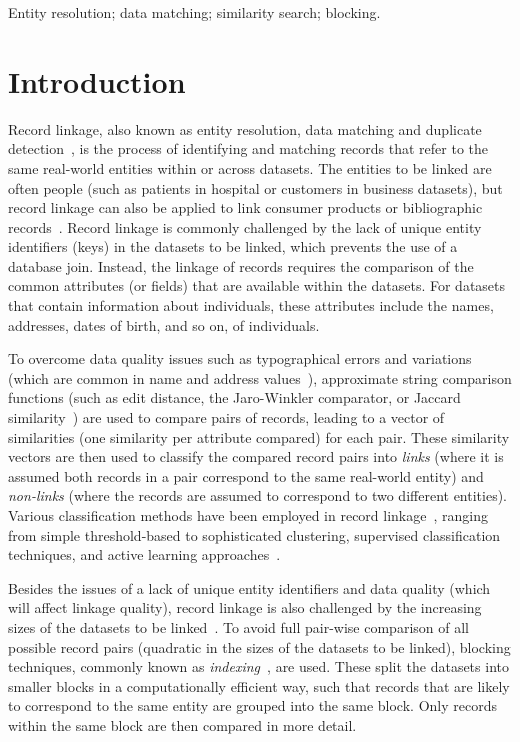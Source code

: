 \documentclass{llncs}
\begin{document}
\keywords Entity resolution; data matching; similarity search;
         blocking.


\section{Introduction}
\label{sec-intro}

Record linkage, also known as entity resolution, data matching and
duplicate detection~\cite{Chr12}, is the process of identifying and
matching records that refer to the same real-world entities within or
across datasets. The entities to be linked are often people (such as
patients in hospital or customers in business datasets), but record
linkage can also be applied to link consumer products or bibliographic
records~\cite{Chr12}. Record linkage is commonly challenged by the lack
of unique entity identifiers (keys) in the datasets to be linked, which
prevents the use of a database join. Instead, the linkage of records
requires the comparison of the common attributes (or fields) that are
available within the datasets. For datasets that contain information
about individuals, these attributes include the names, addresses,
dates of birth, and so on, of individuals.

To overcome data quality issues such as typographical errors and
variations (which are common in name and address values~\cite{Chr12}),
approximate string comparison functions (such as edit distance, the
Jaro-Winkler comparator, or Jaccard similarity~\cite{Chr12}) are used to
compare pairs of records, leading to a vector of similarities (one
similarity per attribute compared) for each pair. These similarity
vectors are then used to classify the compared record pairs into
\emph{links} (where it is assumed both records in a pair correspond to
the same real-world entity) and \emph{non-links} (where the records are
assumed to correspond to two different entities). Various
classification methods have been employed in record
linkage~\cite{Chr12,Don15}, ranging from simple threshold-based to
sophisticated clustering, supervised classification techniques, and
active learning approaches~\cite{Wan15}.

Besides the issues of a lack of unique entity identifiers and data
quality (which will affect linkage quality), record linkage is also
challenged by the increasing sizes of the datasets to be
linked~\cite{Don15}. To avoid full pair-wise comparison of all possible
record pairs (quadratic in the sizes of the datasets to be linked),
blocking techniques, commonly known as \emph{indexing}~\cite{Chr12b},
are used. These split the datasets into smaller blocks in a
computationally efficient way, such that records that are likely to
correspond to the same entity are grouped into the same block. Only
records within the same block are then compared in more detail.
\end{document}
